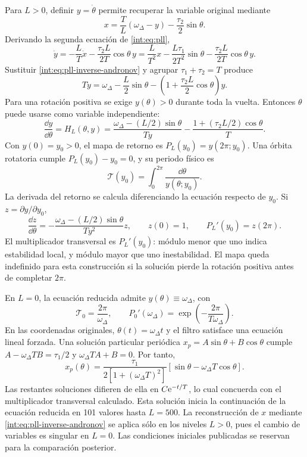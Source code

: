 Para \(L>0\), definir \(y=\dot\theta\) permite recuperar la variable
original mediante
\begin{equation}
 x=\frac T L(\omega_\Delta-y)-\frac{\tau_2}{2}\sin\theta.
 \label{int:eq:pll-inverse-andronov}
\end{equation}
Derivando la segunda ecuación de \eqref{int:eq:pll},
\[
 \dot y=-\frac L T\dot x-\frac{\tau_2L}{2T}\cos\theta\,y
        =\frac L{T^2}x-\frac{L\tau_1}{2T^2}\sin\theta
         -\frac{\tau_2L}{2T}\cos\theta\,y.
\]
Sustituir \eqref{int:eq:pll-inverse-andronov} y agrupar
\(\tau_1+\tau_2=T\) produce
\begin{equation}
 T\dot y=\omega_\Delta-\frac{L}{2}\sin\theta
 -\left(1+\frac{\tau_2L}{2}\cos\theta\right)y.
 \label{int:eq:pll-andronov}
\end{equation}
Para una rotación positiva se exige \(y(\theta)>0\) durante toda la
vuelta. Entonces \(\theta\) puede usarse como variable independiente:
\begin{equation}
 \frac{\dd y}{\dd\theta}=H_L(\theta,y)
 =\frac{\omega_\Delta-(L/2)\sin\theta}{Ty}
  -\frac{1+(\tau_2L/2)\cos\theta}{T}.
 \label{int:eq:pll-angle-flow}
\end{equation}
Con \(y(0)=y_0>0\), el mapa de retorno es
\(P_L(y_0)=y(2\pi;y_0)\). Una órbita rotatoria cumple
\(P_L(y_0)-y_0=0\), y su periodo físico es
\[
 \mathcal T(y_0)=\int_0^{2\pi}\frac{\dd\theta}{y(\theta;y_0)}.
\]
La derivada del retorno se calcula diferenciando la ecuación respecto de
\(y_0\). Si \(z=\partial y/\partial y_0\),
\[
 \frac{\dd z}{\dd\theta}
 =-\frac{\omega_\Delta-(L/2)\sin\theta}{Ty^2}z,
 \qquad z(0)=1,\qquad P_L'(y_0)=z(2\pi).
\]
El multiplicador transversal es \(P_L'(y_0)\): módulo menor que uno indica
estabilidad local, y módulo mayor que uno inestabilidad. El mapa queda
indefinido para esta construcción si la solución pierde la rotación positiva
antes de completar \(2\pi\).

En \(L=0\), la ecuación reducida admite \(y(\theta)\equiv\omega_\Delta\),
con
\[
 \mathcal T_0=\frac{2\pi}{\omega_\Delta},\qquad
 P_0'(\omega_\Delta)=\exp\!\left(-\frac{2\pi}{T\omega_\Delta}\right).
\]
En las coordenadas originales, \(\theta(t)=\omega_\Delta t\) y el filtro
satisface una ecuación lineal forzada. Una solución particular periódica
\(x_p=A\sin\theta+B\cos\theta\) cumple
\(A-\omega_\Delta TB=\tau_1/2\) y
\(\omega_\Delta TA+B=0\). Por tanto,
\[
 x_p(\theta)=\frac{\tau_1}{2[1+(\omega_\Delta T)^2]}
             [\sin\theta-\omega_\Delta T\cos\theta].
\]
Las restantes soluciones difieren de ella en \(C\mathrm e^{-t/T}\), lo cual
concuerda con el multiplicador transversal calculado.
Esta solución inicia la continuación de la ecuación reducida en 101 valores
hasta \(L=500\). La reconstrucción de \(x\) mediante
\eqref{int:eq:pll-inverse-andronov} se aplica sólo en los niveles \(L>0\),
pues el cambio de variables es singular en \(L=0\). Las condiciones iniciales
publicadas se reservan para la comparación posterior.

